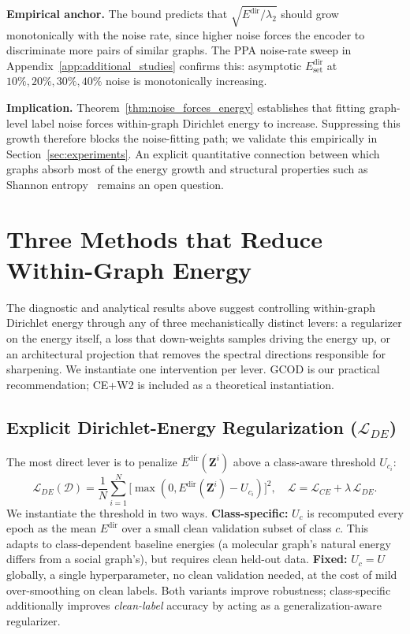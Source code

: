 \documentclass{article}
\theoremstyle{definition}
\newcommand{\method}{GCOD}
\newcommand{\Edir}{E^{\text{dir}}}
\newcommand{\Edirset}{E^{\text{dir}}_{\text{set}}}
\begin{document}
\textbf{Empirical anchor.} The bound predicts that $\sqrt{\Edir/\lambda_2}$ should grow monotonically with the noise rate, since higher noise forces the encoder to discriminate more pairs of similar graphs. The PPA noise-rate sweep in Appendix~\ref{app:additional_studies} confirms this: asymptotic $\Edirset$ at $10\%,20\%,30\%,40\%$ noise is monotonically increasing.

\textbf{Implication.} Theorem~\ref{thm:noise_forces_energy} establishes that fitting graph-level label noise forces within-graph Dirichlet energy to increase. Suppressing this growth therefore blocks the noise-fitting path; we validate this empirically in Section~\ref{sec:experiments}. An explicit quantitative connection between which graphs absorb most of the energy growth and structural properties such as Shannon entropy~\citep{exploreOversmoothing} remains an open question.

\section{Three Methods that Reduce Within-Graph Energy}
\label{sec:methods}

The diagnostic and analytical results above suggest controlling within-graph Dirichlet energy through any of three mechanistically distinct levers: a regularizer on the energy itself, a loss that down-weights samples driving the energy up, or an architectural projection that removes the spectral directions responsible for sharpening. We instantiate one intervention per lever. \method{} is our practical recommendation; CE+W2 is included as a theoretical instantiation.

\subsection{Explicit Dirichlet-Energy Regularization ($\mathcal{L}_{DE}$)}

The most direct lever is to penalize $\Edir(\mathbf{Z}^i)$ above a class-aware threshold $U_{c_i}$:
\begin{equation}
\mathcal{L}_{DE}(\mathcal{D})=\frac{1}{N}\sum_{i=1}^N\bigl[\max(0,\Edir(\mathbf{Z}^i)-U_{c_i})\bigr]^2,\quad
\mathcal{L}=\mathcal{L}_{CE}+\lambda\,\mathcal{L}_{DE}.
\label{eq:lde}
\end{equation}
We instantiate the threshold in two ways. \textbf{Class-specific:} $U_c$ is recomputed every epoch as the mean $\Edir$ over a small clean validation subset of class $c$. This adapts to class-dependent baseline energies (a molecular graph's natural energy differs from a social graph's), but requires clean held-out data. \textbf{Fixed:} $U_c=U$ globally, a single hyperparameter, no clean validation needed, at the cost of mild over-smoothing on clean labels. Both variants improve robustness; class-specific additionally improves \emph{clean-label} accuracy by acting as a generalization-aware regularizer.
\end{document}
